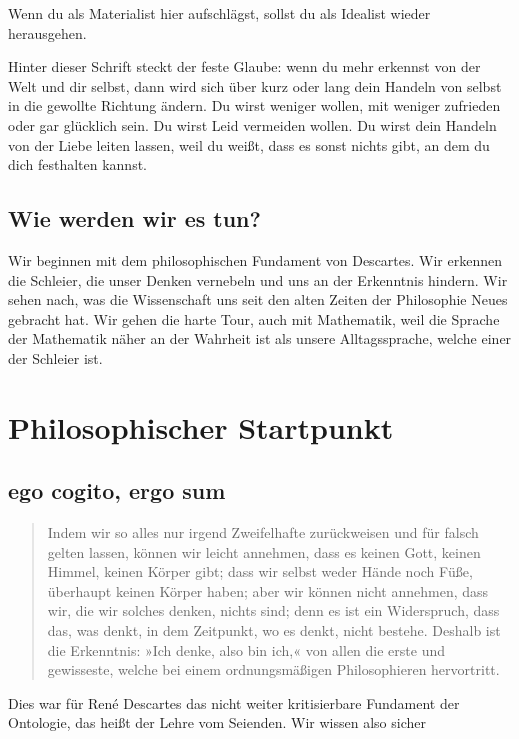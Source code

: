 \documentclass[12pt]{book}
\begin{document}
Wenn du als Materialist hier aufschlägst, sollst du als Idealist wieder herausgehen.

Hinter dieser Schrift steckt der feste Glaube: wenn du mehr erkennst von der Welt und dir selbst,
dann wird sich über kurz oder lang dein Handeln von selbst in die gewollte Richtung ändern. Du wirst weniger wollen, mit weniger zufrieden
oder gar glücklich sein. Du wirst Leid vermeiden wollen. Du wirst dein Handeln von der Liebe leiten lassen, weil du weißt,
dass es sonst nichts gibt, an dem du dich festhalten kannst.

\section{Wie werden wir es tun?}

Wir beginnen mit dem philosophischen Fundament von Descartes.
Wir erkennen die Schleier, die unser Denken vernebeln und uns an der Erkenntnis hindern.
Wir sehen nach, was die Wissenschaft uns seit den alten Zeiten der Philosophie Neues gebracht hat.
Wir gehen die harte Tour, auch mit Mathematik, weil die Sprache der Mathematik näher an der Wahrheit ist als unsere Alltagssprache, welche einer der Schleier ist.

\chapter{Philosophischer Startpunkt}

\section{ego cogito, ergo sum}

\begin{quote}\begin{tcolorbox}
Indem wir so alles nur irgend Zweifelhafte zurückweisen und für falsch gelten lassen, können wir leicht annehmen, dass es keinen Gott, keinen Himmel, keinen Körper gibt; dass wir selbst weder Hände noch Füße, überhaupt keinen Körper haben; aber wir können nicht annehmen, dass wir, die wir solches denken, nichts sind; denn es ist ein Widerspruch, dass das, was denkt, in dem Zeitpunkt, wo es denkt, nicht bestehe. Deshalb ist die Erkenntnis: »Ich denke, also bin ich,« von allen die erste und gewisseste, welche bei einem ordnungsmäßigen Philosophieren hervortritt.
\end{tcolorbox}\end{quote}

Dies war für René Descartes das nicht weiter kritisierbare Fundament der Ontologie, das heißt der Lehre vom Seienden. Wir wissen also sicher
\end{document}
